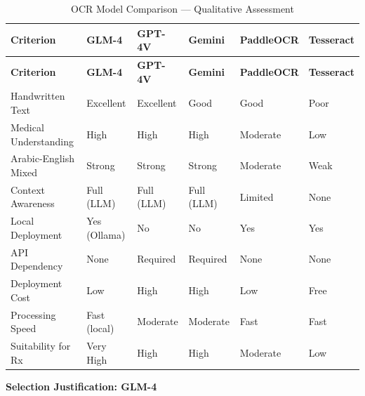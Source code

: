 \documentclass[12pt,a4paper,oneside]{report}
\begin{document}
\begin{longtable}[]{@{}
  >{\raggedright\arraybackslash}p{}
  >{\raggedright\arraybackslash}p{}
  >{\raggedright\arraybackslash}p{}
  >{\raggedright\arraybackslash}p{}
  >{\raggedright\arraybackslash}p{}
  >{\raggedright\arraybackslash}p{}@{}}
\caption{OCR Model Comparison — Qualitative Assessment\label{tab:table_ocr_comparison}}\\
\toprule
\textbf{Criterion} & \textbf{GLM-4} & \textbf{GPT-4V} & \textbf{Gemini} & \textbf{PaddleOCR} & \textbf{Tesseract} \\
\midrule
\endfirsthead
\toprule
\textbf{Criterion} & \textbf{GLM-4} & \textbf{GPT-4V} & \textbf{Gemini} & \textbf{PaddleOCR} & \textbf{Tesseract} \\
\midrule
\endhead
\bottomrule
\endlastfoot
Handwritten Text & Excellent & Excellent & Good & Good & Poor \\
Medical Understanding & High & High & High & Moderate & Low \\
Arabic-English Mixed & Strong & Strong & Strong & Moderate & Weak \\
Context Awareness & Full (LLM) & Full (LLM) & Full (LLM) & Limited & None \\
Local Deployment & Yes (Ollama) & No & No & Yes & Yes \\
API Dependency & None & Required & Required & None & None \\
Deployment Cost & Low & High & High & Low & Free \\
Processing Speed & Fast (local) & Moderate & Moderate & Fast & Fast \\
Suitability for Rx & Very High & High & High & Moderate & Low \\
\end{longtable}

\textbf{Selection Justification: GLM-4}
\end{document}
